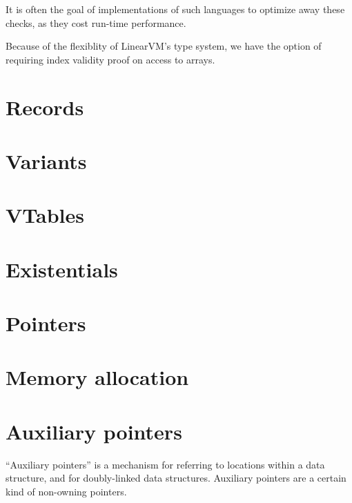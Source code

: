 \documentclass[a4paper]{book}
\begin{document}
It is often the goal of implementations of such languages to optimize
away these checks, as they cost run-time performance.

Because of the flexiblity of LinearVM's type system, we have the option
of requiring index validity proof on access to arrays.


\chapter{Records}

\chapter{Variants}
\chapter{VTables}
\chapter{Existentials}

\chapter{Pointers}

\chapter{Memory allocation}


\chapter{Auxiliary pointers}
``Auxiliary pointers'' is a mechanism for referring to locations within
a data structure, and for doubly-linked data structures.
Auxiliary pointers are a certain kind of non-owning pointers.
\end{document}

